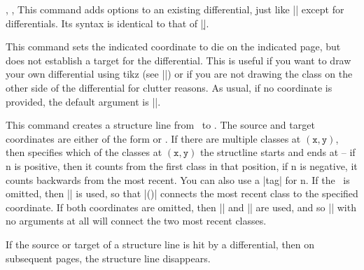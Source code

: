\begin{sseqdata}[|| name = ex1, cohomological Serre grading]
\begin{commandlist}{
    {\doptions\moptions{}},
    {\doptions\moptions{}\pars{\sourcename\opt{,\targetn}}},
    {\doptions\moptions{}\pars{\sourcecoord}\pars{\targetcoord}}%
}
This command adds options to an existing differential, just like |\classoptions| except for differentials. Its syntax is identical to that of |\d|.
\end{commandlist}

\begin{command}{\kill{}}
This command sets the indicated coordinate to die on the indicated page, but does not establish a target for the differential. This is useful if you want to draw your own differential using tikz (see |\getdtarget|) or if you are not drawing the class on the other side of the differential for clutter reasons. As usual, if no coordinate is provided, the default argument is |\lastclass|.
\end{command}

\begin{command}{\structline\ooptions\opt{\pars{\sourcecoord}\pars{\targetcoord}}}
This command creates a structure line from \sourcecoord\  to \targetcoord. The source and target coordinates are either of the form  or . If there are multiple classes at $\mathtt{(x,y)}$, then  specifies which of the classes at $\mathtt{(x,y)}$ the structline starts and ends at -- if n is positive, then it counts from the first class in that position, if n is negative, it counts backwards from the most recent. You can also use a |tag| for n. If the \targetcoord\ is omitted, then |\lastclass| is used, so that |\structline(\sourcecoord)| connects the most recent class to the specified coordinate. If both coordinates are omitted, then |\lastclass| and || are used, and so |\structline| with no arguments at all will connect the two most recent classes.

If the source or target of a structure line is hit by a differential, then on subsequent pages, the structure line disappears.


\end{command}
\end{sseqdata}
